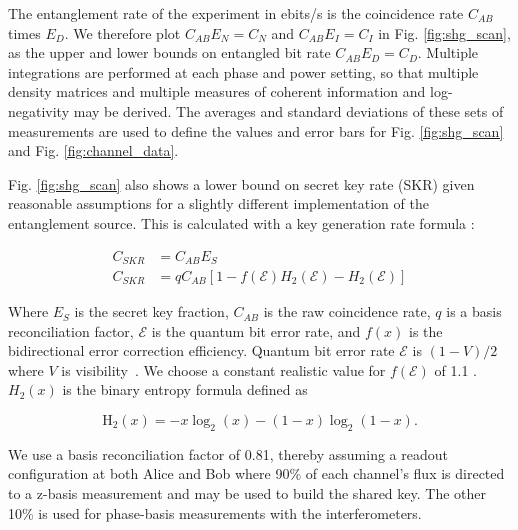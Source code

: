 \documentclass[11pt]{caltech_thesis} %
\begin{document}
The entanglement rate of the experiment in ebits/s is the coincidence rate $C_{AB}$ times $E_D$. We therefore plot $C_{AB}E_N = C_N$ and $C_{AB}E_I = C_I$ in Fig. \ref{fig:shg_scan}, as the upper and lower bounds on entangled bit rate $C_{AB}E_D = C_D$. Multiple integrations are performed at each phase and power setting, so that multiple density matrices and multiple measures of coherent information and log-negativity may be derived. The averages and standard deviations of these sets of measurements are used to define the values and error bars for Fig. \ref{fig:shg_scan} and Fig. \ref{fig:channel_data}.

Fig. \ref{fig:shg_scan} also shows a lower bound on secret key rate (SKR) given reasonable assumptions for a slightly different implementation of the entanglement source. This is calculated with a key generation rate formula \autocite{ma2007quantum}:

\begin{align}
C_{SKR} &= C_{AB} E_S \\
C_{SKR} &= q C_{AB}[1-f(\mathcal{E}) H_2(\mathcal{E})-H_2(\mathcal{E})]
\end{align}

Where $E_S$ is the secret key fraction, $C_{AB}$ is the raw coincidence rate, $q$ is a basis reconciliation factor, $\mathcal{E}$ is the quantum bit error rate, and $f(x)$ is the bidirectional error correction efficiency. Quantum bit error rate $\mathcal{E}$ is $(1-V)/2$ where $V$ is visibility~\autocite{Kim2022}. We choose a constant realistic value for $f(\mathcal{E})$ of 1.1 \autocite{ElkoussReconciliation2010}. $H_2(x)$ is the binary entropy formula defined as

$$\mathrm{H}_2(x)=-x \log _2(x)-(1-x) \log _2(1-x).$$

We use a basis reconciliation factor of 0.81, thereby assuming a readout configuration at both Alice and Bob where 90\% of each channel's flux is directed to a z-basis measurement and may be used to build the shared key. The other 10\% is used for phase-basis measurements with the interferometers.
\end{document}
